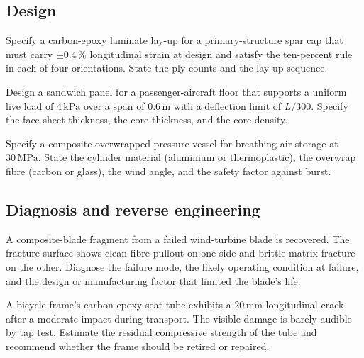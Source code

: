 \subsection*{Design}

\begin{exercise}
Specify a carbon-epoxy laminate lay-up for a primary-structure spar
cap that must carry $\pm 0.4\,\%$ longitudinal strain at design and
satisfy the ten-percent rule in each of four orientations. State the
ply counts and the lay-up sequence.
\end{exercise}

\begin{exercise}
Design a sandwich panel for a passenger-aircraft floor that supports
a uniform live load of $4\,\text{kPa}$ over a span of $0.6\,\text{m}$
with a deflection limit of $L/300$. Specify the face-sheet thickness,
the core thickness, and the core density.
\end{exercise}

\begin{exercise}
Specify a composite-overwrapped pressure vessel for breathing-air
storage at $30\,\text{MPa}$. State the cylinder material (aluminium
or thermoplastic), the overwrap fibre (carbon or glass), the wind
angle, and the safety factor against burst.
\end{exercise}

\subsection*{Diagnosis and reverse engineering}

\begin{exercise}
A composite-blade fragment from a failed wind-turbine blade is
recovered. The fracture surface shows clean fibre pullout on one side
and brittle matrix fracture on the other. Diagnose the failure mode,
the likely operating condition at failure, and the design or
manufacturing factor that limited the blade's life.
\end{exercise}

\begin{exercise}
A bicycle frame's carbon-epoxy seat tube exhibits a $20\,\text{mm}$
longitudinal crack after a moderate impact during transport. The
visible damage is barely audible by tap test. Estimate the residual
compressive strength of the tube and recommend whether the frame
should be retired or repaired.
\end{exercise}

